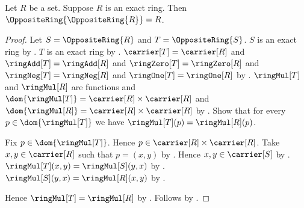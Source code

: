 \begin{theorem}\label{opposite_ring_involutive}
    Let $R$ be a set.
    Suppose $R$ is an exact ring.
    Then $\OppositeRing{\OppositeRing{R}}=R$.
\end{theorem}
\begin{proof}
    Let $S=\OppositeRing{R}$ and $T=\OppositeRing{S}$.
    $S$ is an exact ring by .
    $T$ is an exact ring by .
    $\carrier[T]=\carrier[R]$ and
        $\ringAdd[T]=\ringAdd[R]$ and
        $\ringZero[T]=\ringZero[R]$ and
        $\ringNeg[T]=\ringNeg[R]$ and
        $\ringOne[T]=\ringOne[R]$ by
        .
    $\ringMul[T]$ and $\ringMul[R]$ are functions and
        $\dom{\ringMul[T]}=\carrier[R]\times\carrier[R]$ and
        $\dom{\ringMul[R]}=\carrier[R]\times\carrier[R]$ by
        .
    Show that for every $p\in\dom{\ringMul[T]}$ we have
        $\ringMul[T](p)=\ringMul[R](p)$.
    \begin{subproof}
        Fix $p\in\dom{\ringMul[T]}$.
        Hence $p\in\carrier[R]\times\carrier[R]$.
        Take $x,y\in\carrier[R]$ such that $p=(x,y)$ by
            .
        Hence $x,y\in\carrier[S]$ by
            .
        $\ringMul[T](x,y)=\ringMul[S](y,x)$ by
            .
        $\ringMul[S](y,x)=\ringMul[R](x,y)$ by
            .
    \end{subproof}
    Hence $\ringMul[T]=\ringMul[R]$ by .
    Follows by .
\end{proof}

